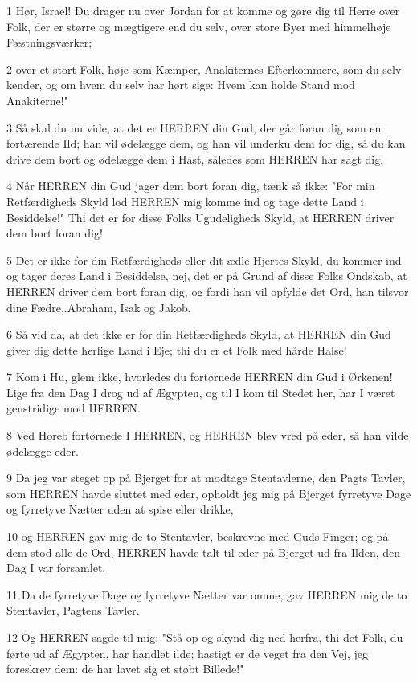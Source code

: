 \par 1 Hør, Israel! Du drager nu over Jordan for at komme og gøre dig til Herre over Folk, der er større og mægtigere end du selv, over store Byer med himmelhøje Fæstningsværker;
\par 2 over et stort Folk, høje som Kæmper, Anakiternes Efterkommere, som du selv kender, og om hvem du selv har hørt sige: Hvem kan holde Stand mod Anakiterne!"
\par 3 Så skal du nu vide, at det er HERREN din Gud, der går foran dig som en fortærende Ild; han vil ødelægge dem, og han vil underku dem for dig, så du kan drive dem bort og ødelægge dem i Hast, således som HERREN har sagt dig.
\par 4 Når HERREN din Gud jager dem bort foran dig, tænk så ikke: "For min Retfærdigheds Skyld lod HERREN mig komme ind og tage dette Land i Besiddelse!" Thi det er for disse Folks Ugudeligheds Skyld, at HERREN driver dem bort foran dig!
\par 5 Det er ikke for din Retfærdigheds eller dit ædle Hjertes Skyld, du kommer ind og tager deres Land i Besiddelse, nej, det er på Grund af disse Folks Ondskab, at HERREN driver dem bort foran dig, og fordi han vil opfylde det Ord, han tilsvor dine Fædre,.Abraham, Isak og Jakob.
\par 6 Så vid da, at det ikke er for din Retfærdigheds Skyld, at HERREN din Gud giver dig dette herlige Land i Eje; thi du er et Folk med hårde Halse!
\par 7 Kom i Hu, glem ikke, hvorledes du fortørnede HERREN din Gud i Ørkenen! Lige fra den Dag I drog ud af Ægypten, og til I kom til Stedet her, har I været genstridige mod HERREN.
\par 8 Ved Horeb fortørnede I HERREN, og HERREN blev vred på eder, så han vilde ødelægge eder.
\par 9 Da jeg var steget op på Bjerget for at modtage Stentavlerne, den Pagts Tavler, som HERREN havde sluttet med eder, opholdt jeg mig på Bjerget fyrretyve Dage og fyrretyve Nætter uden at spise eller drikke,
\par 10 og HERREN gav mig de to Stentavler, beskrevne med Guds Finger; og på dem stod alle de Ord, HERREN havde talt til eder på Bjerget ud fra Ilden, den Dag I var forsamlet.
\par 11 Da de fyrretyve Dage og fyrretyve Nætter var omme, gav HERREN mig de to Stentavler, Pagtens Tavler.
\par 12 Og HERREN sagde til mig: "Stå op og skynd dig ned herfra, thi det Folk, du førte ud af Ægypten, har handlet ilde; hastigt er de veget fra den Vej, jeg foreskrev dem: de har lavet sig et støbt Billede!"
